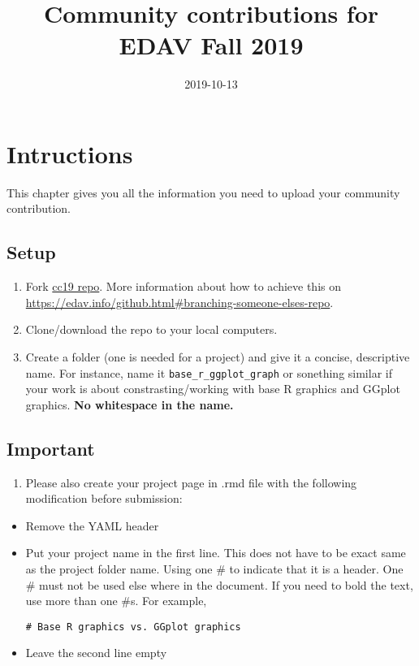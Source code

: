 \documentclass[]{book}
\title{Community contributions for EDAV Fall 2019}
\author{}
\date{2019-10-13}
\providecommand{\tightlist}{%
  \setlength{\itemsep}{0pt}\setlength{\parskip}{0pt}}
\begin{document}
\maketitle

{
\setcounter{tocdepth}{1}
\tableofcontents
}
\hypertarget{intructions}{%
\chapter{Intructions}\label{intructions}}

This chapter gives you all the information you need to upload your community contribution.

\hypertarget{setup}{%
\section{Setup}\label{setup}}

\begin{enumerate}
\def\labelenumi{\arabic{enumi}.}
\item
  Fork \href{https://github.com/jtr13/cc19}{cc19 repo}. More information about how to achieve this on \url{https://edav.info/github.html\#branching-someone-elses-repo}.
\item
  Clone/download the repo to your local computers.
\item
  Create a folder (one is needed for a project) and give it a concise, descriptive name. For instance, name it \texttt{base\_r\_ggplot\_graph} or sonething similar if your work is about constrasting/working with base R graphics and GGplot graphics. \textbf{No whitespace in the name.}
\end{enumerate}

\hypertarget{important}{%
\section{Important}\label{important}}

\begin{enumerate}
\def\labelenumi{\arabic{enumi}.}
\tightlist
\item
  Please also create your project page in .rmd file with the following modification before submission:
\end{enumerate}

\begin{itemize}
\item
  Remove the YAML header
\item
  Put your project name in the first line. This does not have to be exact same as the project folder name. Using one \# to indicate that it is a header. One \# must not be used else where in the document. If you need to bold the text, use more than one \#s. For example,

\begin{verbatim}
# Base R graphics vs. GGplot graphics
\end{verbatim}
\item
  Leave the second line empty
\end{itemize}
\end{document}
